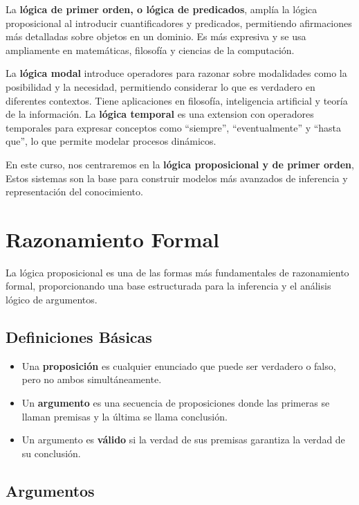 La \textbf{lógica de primer orden, o lógica de predicados}, amplía la lógica proposicional al introducir cuantificadores y predicados, permitiendo afirmaciones más detalladas sobre objetos en un dominio. Es más expresiva y se usa ampliamente en matemáticas, filosofía y ciencias de la computación.

La \textbf{lógica modal} introduce operadores para razonar sobre modalidades como la posibilidad y la necesidad, permitiendo considerar lo que es verdadero en diferentes contextos. Tiene aplicaciones en filosofía, inteligencia artificial y teoría de la información. La \textbf{lógica temporal} es una extension con operadores temporales para expresar conceptos como ``siempre'', ``eventualmente'' y ``hasta que'', lo que  permite modelar procesos dinámicos.

En este curso, nos centraremos en la \textbf{lógica proposicional y de primer orden}, Estos sistemas son la base para construir modelos más avanzados de inferencia y representación del conocimiento.


\section{Razonamiento Formal}
La l\'ogica proposicional es una de las formas m\'as fundamentales de razonamiento formal, proporcionando una base estructurada para la inferencia y el análisis lógico de argumentos.


\subsection{Definiciones B\'asicas}

\begin{itemize}
    \item Una \textbf{proposici\'on} es cualquier enunciado que puede ser verdadero o falso, pero no ambos simult\'aneamente.
    \item Un \textbf{argumento} es una secuencia de proposiciones donde las primeras se llaman premisas y la \'ultima se llama conclusi\'on.
    \item Un argumento es \textbf{v\'alido} si la verdad de sus premisas garantiza la verdad de su conclusi\'on.
\end{itemize}


\subsection{Argumentos}

